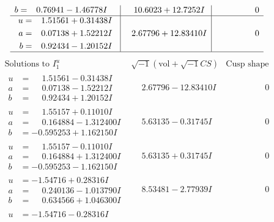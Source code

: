 \documentclass[1p]{elsarticle_modified}
\theoremstyle{definition}
\newcommand{\I}{\sqrt{-1}}
\begin{document}
$$\begin{array}{c|c|c}
\begin{aligned}
b &= \phantom{-}0.76941 - 1.46778 I\end{aligned}
 & \phantom{-}10.6023 + 12.7252 I & \phantom{-0.000000 } 0 \\ \hline\begin{aligned}
u &= \phantom{-}1.51561 + 0.31438 I \\
a &= \phantom{-}0.07138 + 1.52212 I \\
b &= \phantom{-}0.92434 - 1.20152 I\end{aligned}
 & \phantom{-}2.67796 + 12.83410 I & \phantom{-0.000000 } 0\\
 \hline 
 \end{array}$$\newpage$$\begin{array}{c|c|c}  
\text{Solutions to }I^u_{1}& \I (\text{vol} + \sqrt{-1}CS) & \text{Cusp shape}\\
 \hline 
\begin{aligned}
u &= \phantom{-}1.51561 - 0.31438 I \\
a &= \phantom{-}0.07138 - 1.52212 I \\
b &= \phantom{-}0.92434 + 1.20152 I\end{aligned}
 & \phantom{-}2.67796 - 12.83410 I & \phantom{-0.000000 } 0 \\ \hline\begin{aligned}
u &= \phantom{-}1.55157 + 0.11010 I \\
a &= \phantom{-}0.164884 - 1.312400 I \\
b &= -0.595253 + 1.162150 I\end{aligned}
 & \phantom{-}5.63135 - 0.31745 I & \phantom{-0.000000 } 0 \\ \hline\begin{aligned}
u &= \phantom{-}1.55157 - 0.11010 I \\
a &= \phantom{-}0.164884 + 1.312400 I \\
b &= -0.595253 - 1.162150 I\end{aligned}
 & \phantom{-}5.63135 + 0.31745 I & \phantom{-0.000000 } 0 \\ \hline\begin{aligned}
u &= -1.54716 + 0.28316 I \\
a &= \phantom{-}0.240136 - 1.013790 I \\
b &= \phantom{-}0.634566 + 1.046300 I\end{aligned}
 & \phantom{-}8.53481 - 2.77939 I & \phantom{-0.000000 } 0 \\ \hline\begin{aligned}
u &= -1.54716 - 0.28316 I \\

\end{aligned}
\end{array}$$
\end{document}
